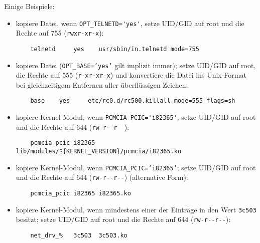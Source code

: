     Einige Beispiele:
    \begin{itemize}
    \item kopiere Datei, wenn \verb+OPT_TELNETD='yes'+, setze
UID/GID auf root und die Rechte auf 755 (\verb?rwxr-xr-x?):

\begin{example}
\begin{verbatim}
    telnetd     yes    usr/sbin/in.telnetd mode=755
\end{verbatim}
\end{example}

    \item kopiere Datei (\texttt{OPT\_BASE='yes'} gilt implizit immer); setze
UID/GID auf root, die Rechte auf 555 (\verb?r-xr-xr-x?) und konvertiere die
Datei ins Unix-Format bei gleichzeitigem Entfernen aller überflüssigen
Zeichen:

\begin{example}
\begin{verbatim}
    base    yes     etc/rc0.d/rc500.killall mode=555 flags=sh
\end{verbatim}
\end{example}

    \item kopiere Kernel-Modul, wenn \verb+PCMCIA_PCIC='i82365'+; setze
UID/GID auf root und die Rechte auf 644 (\verb?rw-r--r--?):

\begin{example}
\begin{verbatim}
    pcmcia_pcic i82365 lib/modules/${KERNEL_VERSION}/pcmcia/i82365.ko
\end{verbatim}
\end{example}

    \item kopiere Kernel-Modul, wenn \texttt{PCMCIA\_\-PCIC='i82365'}; setze
UID/GID auf root und die Rechte auf 644 (\verb?rw-r--r--?) (alternative Form):

\begin{example}
\begin{verbatim}
    pcmcia_pcic i82365 i82365.ko
\end{verbatim}
\end{example}

    \item kopiere Kernel-Modul, wenn mindestens einer der Einträge in
 den Wert \texttt{3c503} besitzt; setze
UID/GID auf root und die Rechte auf 644 (\verb?rw-r--r--?):
\begin{example}
\begin{verbatim}
    net_drv_%   3c503  3c503.ko
\end{verbatim}
\end{example}


\end{itemize}
